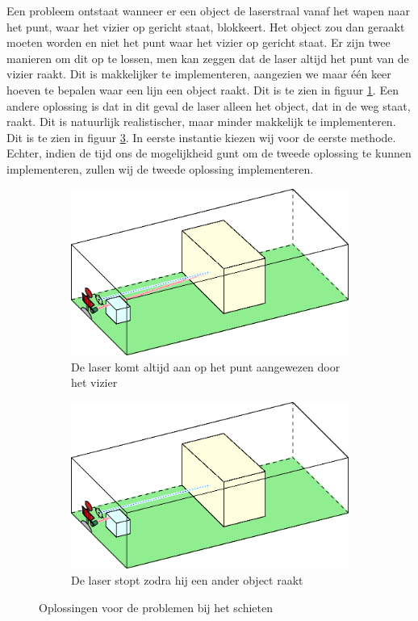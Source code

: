 Een probleem ontstaat wanneer er een object de laserstraal vanaf het wapen naar het punt, waar het vizier op gericht staat, blokkeert. Het object zou dan geraakt moeten worden en niet het punt waar het vizier op gericht staat. Er zijn twee manieren om dit op te lossen, men kan zeggen dat de laser altijd het punt van de vizier raakt. Dit is makkelijker te implementeren, aangezien we maar \'e\'en keer hoeven te bepalen waar een lijn een object raakt. Dit is te zien in figuur \ref{fig:COL2}. Een andere oplossing is dat in dit geval de laser alleen het object, dat in de weg staat, raakt. Dit is natuurlijk realistischer, maar minder makkelijk te implementeren. Dit is te zien in figuur \ref{fig:COL3}. In eerste instantie kiezen wij voor de eerste methode. Echter, indien de tijd ons de mogelijkheid gunt om de tweede oplossing te kunnen implementeren, zullen wij de tweede oplossing implementeren.
\FloatBarrier
\begin{figure}[h]
\begin{subfigure}{0.45\textwidth}
\centering
\includegraphics[width=\textwidth]{Graphics/Collision2.eps}
\caption{De laser komt altijd aan op het punt aangewezen door het vizier}
\label{fig:COL2}
\end{subfigure}
\begin{subfigure}{0.45\textwidth}
\centering
\includegraphics[width=\textwidth]{Graphics/Collision3.eps}
\caption{De laser stopt zodra hij een ander object raakt}
\label{fig:COL3}
\end{subfigure}
\caption{Oplossingen voor de problemen bij het schieten}
\end{figure}


